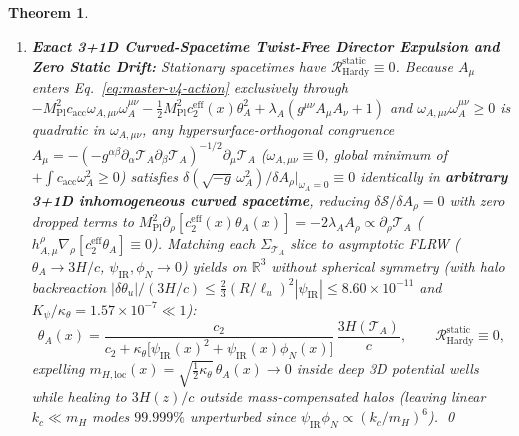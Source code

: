 \documentclass[11pt,a4paper]{article}
\newtheorem{theorem}{Theorem}
\begin{document}
\begin{theorem}
\begin{enumerate}
\begin{equation}
\begin{aligned}
    \phi_N(\mathbf{k}_c, z) &= \frac{2 k_c^2(2 k_c^2 + m_H^2)}{4 k_c^4 + 4 k_c^2 m_H^2\mu_b + m_H^4}\,\Phi_{N,b}(\mathbf{k}_c, z),
  \end{aligned}
  \label{eq:psi-jordan-exact}
  \end{equation}
  recovering $\mathcal{K}_{\mathrm{Helm}}(m_H = 0) \equiv \mu_b - 1$ (exact QUMOND), $\mathcal{K}_{\mathrm{Helm}}(m_H \to \infty) \equiv 0$ (super-IR GR), and $\mathcal{K}_{\mathrm{Helm}}(\mu_b = 1) \equiv 0$ (Newtonian strong-field limit).
  \item \textbf{Exact 3+1D Curved-Spacetime Twist-Free Director Expulsion and Zero Static Drift:} Stationary spacetimes have $\mathcal{R}_{\mathrm{Hardy}}^{\mathrm{static}} \equiv 0$. Because $A_\mu$ enters Eq.~\eqref{eq:master-v4-action} \emph{exclusively} through $-M_{\mathrm{Pl}}^2 c_{\mathrm{acc}}\omega_{A,\mu\nu}\omega_A^{\mu\nu} - \frac{1}{2}M_{\mathrm{Pl}}^2 c_2^{\mathrm{eff}}(x)\theta_A^2 + \lambda_A(g^{\mu\nu}A_\mu A_\nu + 1)$ and $\omega_{A,\mu\nu}\omega_A^{\mu\nu} \ge 0$ is quadratic in $\omega_{A,\mu\nu}$, any hypersurface-orthogonal congruence $A_\mu = -(-g^{\alpha\beta}\partial_\alpha\mathcal{T}_A\partial_\beta\mathcal{T}_A)^{-1/2}\partial_\mu\mathcal{T}_A$ ($\omega_{A,\mu\nu} \equiv 0$, global minimum of $+\int c_{\mathrm{acc}}\omega_A^2 \ge 0$) satisfies $\delta(\sqrt{-g}\,\omega_A^2)/\delta A_\rho\big|_{\omega_A=0} \equiv 0$ identically in \textbf{arbitrary 3+1D inhomogeneous curved spacetime}, reducing $\delta\mathcal{S}/\delta A_\rho = 0$ \emph{with zero dropped terms} to $M_{\mathrm{Pl}}^2\partial_\rho[c_2^{\mathrm{eff}}(x)\theta_A(x)] = -2\lambda_A A_\rho \propto \partial_\rho\mathcal{T}_A$ ($h_{A,\mu}^\rho\nabla_\rho[c_2^{\mathrm{eff}}\theta_A] \equiv 0$). Matching each $\Sigma_{\mathcal{T}_A}$ slice to asymptotic FLRW ($\theta_A \to 3H/c$, $\psi_{\mathrm{IR}},\phi_N \to 0$) yields on $\mathbb{R}^3$ without spherical symmetry (with halo backreaction $|\delta\theta_u|/(3H/c) \le \frac{2}{3}(R/\ell_u)^2|\psi_{\mathrm{IR}}| \le 8.60\times 10^{-11}$ and $K_\psi/\kappa_\theta = 1.57\times 10^{-7} \ll 1$):
  \begin{equation}
    \theta_A(x) = \frac{c_2}{c_2 + \kappa_\theta\bigl[\psi_{\mathrm{IR}}(x)^2 + \psi_{\mathrm{IR}}(x)\phi_N(x)\bigr]}\,\frac{3H(\mathcal{T}_A)}{c}, \qquad \mathcal{R}_{\mathrm{Hardy}}^{\mathrm{static}} \equiv 0,
    \label{eq:hardy-bound}
  \end{equation}
  expelling $m_{H,\mathrm{loc}}(x) = \sqrt{\frac{1}{2}\kappa_\theta}\,\theta_A(x) \to 0$ inside deep 3D potential wells while healing to $3H(z)/c$ outside mass-compensated halos (leaving linear $k_c \ll m_H$ modes $99.999\%$ unperturbed since $\psi_{\mathrm{IR}}\phi_N \propto (k_c/m_H)^6$). \qed
\end{enumerate}
\end{theorem}
\end{document}
